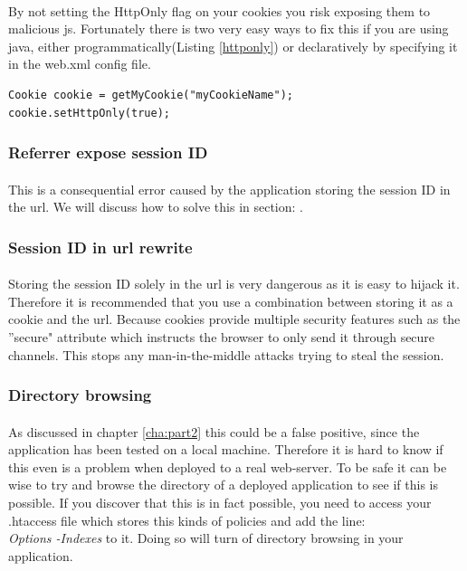 \documentclass[11pt,english,a4paper]{report}
\begin{document}
\paragraph{}
By not setting the HttpOnly flag on your cookies you risk exposing them to malicious \gls{js}.
Fortunately there is two very easy ways to fix this if you are using \gls{java}, either programmatically(Listing \ref{httponly}) or declaratively by specifying it in the web.xml config file.\cite{httponly}
\\
\begin{lstlisting}[caption=Setting the HttpOnly Flag in Java,label=httponly]
Cookie cookie = getMyCookie("myCookieName");
cookie.setHttpOnly(true);
\end{lstlisting}


\subsubsection{Referrer expose session ID}
\paragraph{}
This is a consequential error caused by the application storing the session ID in the \gls{url}.
We will discuss how to solve this in section: .

\subsubsection{Session ID in \gls{url} rewrite}
\label{subsec:sessionid}
\paragraph{}
Storing the session ID solely in the \gls{url} is very dangerous as it is easy to hijack it.
Therefore it is recommended that you use a combination between storing it as a cookie and the \gls{url}.
Because cookies provide multiple security features such as the ''secure" attribute which instructs the browser to only send it through secure channels.
This stops any man-in-the-middle attacks trying to steal the session.\cite{session-management}

\subsubsection{Directory browsing}
\paragraph{}
As discussed in chapter \ref{cha:part2} this could be a false positive, since the application has been tested on a local machine.
Therefore it is hard to know if this even is a problem when deployed to a real web-server. 
To be safe it can be wise to try and browse the directory of a deployed application to see if this is possible.
If you discover that this is in fact possible, you need to access your .htaccess file which stores this kinds of policies and add the line:
\\
\textit{Options -Indexes} to it.
Doing so will turn of directory browsing in your application.
\end{document}
